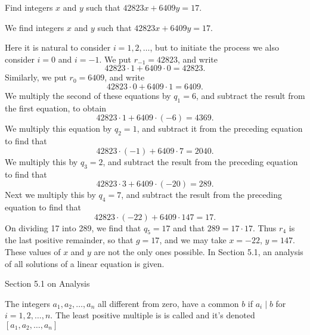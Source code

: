 \documentclass[11pt]{article}
\begin{document}
\begin{example}
    Find integers \(x\) and \(y\) such that \(42823x + 6409y = 17\).
\end{example}
\begin{solution}

    We find integers \(x\) and \(y\) such that \(42823x + 6409y = 17\).

    Here it is natural to consider \(i = 1, 2, \ldots\), but to initiate the
    process we also consider \(i = 0\) and \(i = -1\). We put \(r_{-1} = 42823\),
    and write
    \[42823 \cdot 1 + 6409 \cdot 0 = 42823.\]
    Similarly, we put \(r_0 = 6409\), and write
    \[42823 \cdot 0 + 6409 \cdot 1 = 6409.\]
    We multiply the second of these equations by \(q_1 = 6\), and subtract the
    result from the first equation, to obtain
    \[42823 \cdot 1 + 6409 \cdot (-6) = 4369.\]
    We multiply this equation by \(q_2 = 1\), and subtract it from the preceding
    equation to find that
    \[42823 \cdot (-1) + 6409 \cdot 7 = 2040.\]
    We multiply this by \(q_3 = 2\), and subtract the result from the preceding
    equation to find that
    \[42823 \cdot 3 + 6409 \cdot (-20) = 289.\]
    Next we multiply this by \(q_4 = 7\), and subtract the result from the
    preceding equation to find that
    \[42823 \cdot (-22) + 6409 \cdot 147 = 17.\]
    On dividing 17 into 289, we find that \(q_5 = 17\) and that \(289 = 17 \cdot
    17\). Thus \(r_4\) is the last positive remainder, so that \(g = 17\), and we
    may take \(x = -22\), \(y = 147\). These values of \(x\) and \(y\) are not the
    only ones possible. In Section 5.1, an analysis of all solutions of a linear
    equation is given.
\end{solution}

\begin{remark}
    Section 5.1 on Analysis
\end{remark}

\begin{definition}
    The integers \(a_1, a_2, \ldots , a_n\) all different from zero, have a common \(b\) if \(a_i \mid b\) for \(i = 1, 2, \ldots, n\). The least positive multiple is is called  and it's denoted \([a_1, a_2, \ldots, a_n]\)
\end{definition}
\end{document}
